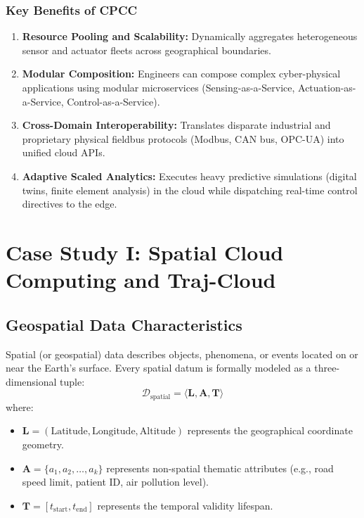 \documentclass[11pt,a4paper,openany]{report}
\begin{document}
\subsubsection{Key Benefits of CPCC}
\begin{enumerate}[leftmargin=*]
  \item \textbf{Resource Pooling and Scalability:} Dynamically aggregates heterogeneous sensor and actuator fleets across geographical boundaries.
  \item \textbf{Modular Composition:} Engineers can compose complex cyber-physical applications using modular microservices (Sensing-as-a-Service, Actuation-as-a-Service, Control-as-a-Service).
  \item \textbf{Cross-Domain Interoperability:} Translates disparate industrial and proprietary physical fieldbus protocols (Modbus, CAN bus, OPC-UA) into unified cloud APIs.
  \item \textbf{Adaptive Scaled Analytics:} Executes heavy predictive simulations (digital twins, finite element analysis) in the cloud while dispatching real-time control directives to the edge.
\end{enumerate}

\section{Case Study I: Spatial Cloud Computing and Traj-Cloud}
\subsection{Geospatial Data Characteristics}
Spatial (or geospatial) data describes objects, phenomena, or events located on or near the Earth's surface. Every spatial datum is formally modeled as a three-dimensional tuple:
\begin{equation}
\mathcal{D}_{\text{spatial}} = \langle \mathbf{L}, \mathbf{A}, \mathbf{T} \rangle
\end{equation}
where:
\begin{itemize}[leftmargin=*]
  \item $\mathbf{L} = (\text{Latitude}, \text{Longitude}, \text{Altitude})$ represents the geographical coordinate geometry.
  \item $\mathbf{A} = \{a_1, a_2, \dots, a_k\}$ represents non-spatial thematic attributes (e.g., road speed limit, patient ID, air pollution level).
  \item $\mathbf{T} = [t_{\text{start}}, t_{\text{end}}]$ represents the temporal validity lifespan.
\end{itemize}
\end{document}
